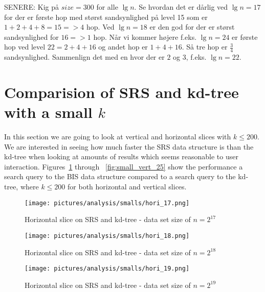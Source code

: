 SENERE: Kig på $size = 300$ for alle $\lg n$. Se hvordan det er dårlig ved $\lg n = 17$ for der er første hop med størst sandsynlighed på level 15 som er $1+2+4+8 = 15 => 4$ hop. Ved $\lg n = 18$ er den god for der er størst sandsynlighed for $16 => 1$ hop. Når vi kommer højere f.eks. $\lg n = 24$ er første hop ved level $22 = 2 + 4 + 16$ og andet hop er $1 + 4 + 16$. Så tre hop er $\frac{3}{4}$ sandsynlighed. Sammenlign det med en hvor der er $2$ og $3$, f.eks. $\lg n = 22$.





\section{Comparision of SRS and kd-tree with a small $k$}
\label{sect:smallk}


In this section we are going to look at vertical and horizontal slices with $k\leq 200$. We are interested in seeing how much faster the SRS data structure is than the kd-tree when looking at amounts of results which seems reasonable to user interaction. Figures~\ref{fig:small_hori_17} through ~\ref{fig:small_vert_25} show the performance a search query to the BIS data structure compared to a search query to the kd-tree, where $k \leq 200$ for both horizontal and vertical slices.

\begin{figure}[h]
    \centering
    \texttt{[image: pictures/analysis/smalls/hori\_17.png]}
    \caption{Horizontal slice on SRS and kd-tree - data set size of $n=2^{17}$}\label{fig:small_hori_17}
\end{figure}

\begin{figure}[h]
    \centering
    \texttt{[image: pictures/analysis/smalls/hori\_18.png]}
    \caption{Horizontal slice on SRS and kd-tree - data set size of $n=2^{18}$}\label{fig:small_hori_18}
\end{figure}

\begin{figure}[h]
    \centering
    \texttt{[image: pictures/analysis/smalls/hori\_19.png]}
    \caption{Horizontal slice on SRS and kd-tree - data set size of $n=2^{19}$}\label{fig:small_hori_19}
\end{figure}

